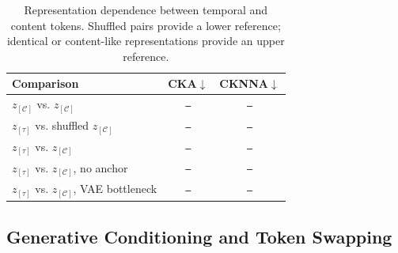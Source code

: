 \documentclass{article}
\newcommand{\zC}{z_{[\mathcal{C}]}}    %
\newcommand{\ztau}{z_{[\tau]}}          %
\newcommand{\res}{\texttt{--}}
\begin{document}
\begin{table}[t]
  \centering
  \setlength{\tabcolsep}{4.5pt}
  \caption{Representation dependence between temporal and content
    tokens.  Shuffled pairs provide a lower reference; identical or
  content-like representations provide an upper reference.}
  \label{tab:dependence}
  \begin{tabular}{lcc}
    \toprule
    \textbf{Comparison}
    & CKA$\downarrow$
    & CKNNA$\downarrow$ \\
    \midrule
    $\zC$ vs. $\zC$ & \res & \res \\
    $\ztau$ vs. shuffled $\zC$ & \res & \res \\
    $\ztau$ vs. $\zC$ & \res & \res \\
    $\ztau$ vs. $\zC$, no anchor & \res & \res \\
    $\ztau$ vs. $\zC$, VAE bottleneck & \res & \res \\
    \bottomrule
  \end{tabular}
\end{table}

\subsection{Generative Conditioning and Token Swapping}
\label{ssec:exp_diffusion_swapping}
\end{document}
